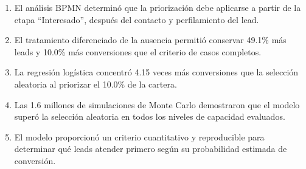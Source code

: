 \begin{enumerate}

\item El análisis BPMN determinó que la priorización debe aplicarse a partir de la etapa ``Interesado'', después del contacto y perfilamiento del lead.

\item El tratamiento diferenciado de la ausencia permitió conservar 49.1\% más leads y 10.0\% más conversiones que el criterio de casos completos.

\item La regresión logística concentró 4.15 veces más conversiones que la selección aleatoria al priorizar el 10.0\% de la cartera.

\item Las 1.6 millones de simulaciones de Monte Carlo demostraron que el modelo superó la selección aleatoria en todos los niveles de capacidad evaluados.

\item El modelo proporcionó un criterio cuantitativo y reproducible para determinar qué leads atender primero según su probabilidad estimada de conversión.

\end{enumerate}